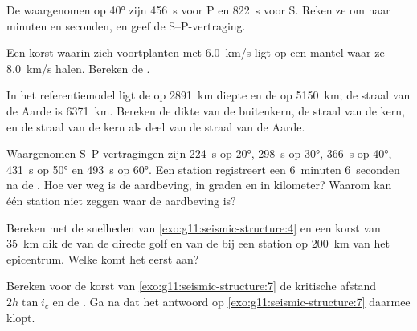 \begin{exercise}[$\star$]\label{exo:g11:seismic-structure:3}
De waargenomen  op \ang{40} zijn \qty{456}{s} voor P en
\qty{822}{s} voor S. Reken ze om naar minuten en seconden, en geef de
S--P-vertraging.
\end{exercise}

\begin{exercise}[$\star$]\label{exo:g11:seismic-structure:4}
Een korst waarin  zich voortplanten met \qty{6.0}{km/s} ligt op een
mantel waar ze \qty{8.0}{km/s} halen. Bereken de .
\end{exercise}

\begin{exercise}[$\star$]\label{exo:g11:seismic-structure:5}
In het referentiemodel ligt de  op \qty{2891}{km} diepte en de
 op \qty{5150}{km}; de straal van de Aarde is
\qty{6371}{km}. Bereken de dikte van de buitenkern, de straal van de kern, en de
straal van de kern als deel van de straal van de Aarde.
\end{exercise}

\begin{exercise}[$\star\star$]\label{exo:g11:seismic-structure:6}
Waargenomen S--P-vertragingen zijn \qty{224}{s} op \ang{20}, \qty{298}{s} op
\ang{30}, \qty{366}{s} op \ang{40}, \qty{431}{s} op \ang{50} en
\qty{493}{s} op \ang{60}. Een station registreert een  6~minuten 6~seconden
na de . Hoe ver weg is de aardbeving, in graden en in kilometer?
Waarom kan één station niet zeggen waar de aardbeving is?
\end{exercise}

\begin{exercise}[$\star\star$]\label{exo:g11:seismic-structure:7}
Bereken met de snelheden van \cref{exo:g11:seismic-structure:4} en een korst van
\qty{35}{km} dik de  van de directe golf en van de  bij een
station op \qty{200}{km} van het epicentrum. Welke komt het eerst aan?
\end{exercise}

\begin{exercise}[$\star\star$]\label{exo:g11:seismic-structure:8}
Bereken voor de korst van \cref{exo:g11:seismic-structure:7} de kritische
afstand $2h\tan i_c$ en de . Ga na dat het antwoord op
\cref{exo:g11:seismic-structure:7} daarmee klopt.
\end{exercise}

